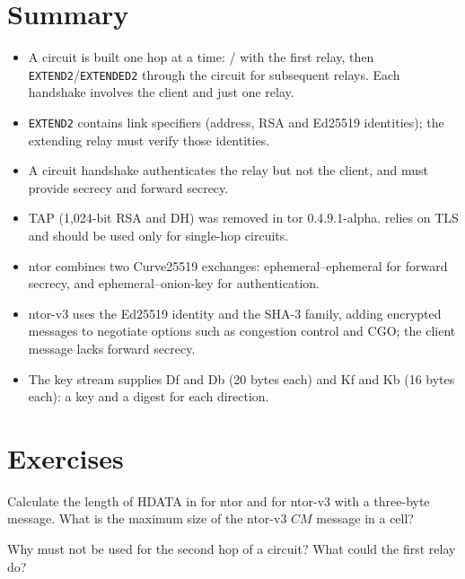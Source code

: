 \section*{Summary}
\begin{itemize}
  \item A circuit is built one hop at a time: / with the first relay, then \texttt{EXTEND2}/\texttt{EXTENDED2} through the circuit for subsequent relays. Each handshake involves the client and just one relay.
  \item \texttt{EXTEND2} contains link specifiers (address, RSA and Ed25519 identities); the extending relay must verify those identities.
  \item A circuit handshake authenticates the relay but not the client, and must provide secrecy and forward secrecy.
  \item TAP (1,024-bit RSA and DH) was removed in tor 0.4.9.1-alpha.  relies on TLS and should be used only for single-hop circuits.
  \item ntor combines two Curve25519 exchanges: ephemeral--ephemeral for forward secrecy, and ephemeral--onion-key for authentication.
  \item ntor-v3 uses the Ed25519 identity and the SHA-3 family, adding encrypted messages to negotiate options such as congestion control and CGO; the client message lacks forward secrecy.
  \item The key stream supplies Df and Db (20 bytes each) and Kf and Kb (16 bytes each): a key and a digest for each direction.
\end{itemize}

\section*{Exercises}

\begin{esercizio}[1]\label{es:09-dimensioni}
Calculate the length of HDATA in  for ntor and for ntor-v3 with a three-byte message. What is the maximum size of the ntor-v3 $CM$ message in a  cell?
\end{esercizio}

\begin{esercizio}[1]\label{es:09-fast}
Why must  not be used for the second hop of a circuit? What could the first relay do?
\end{esercizio}

